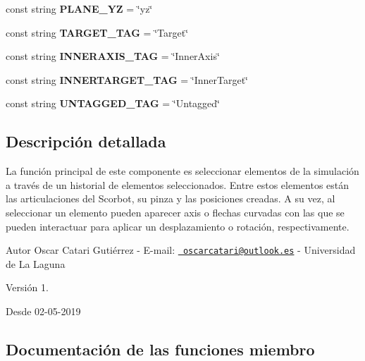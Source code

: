\begin{DoxyCompactItemize}
const string {\bfseries P\+L\+A\+N\+E\+\_\+\+YZ} = \char`\"{}yz\char`\"{}
\item 
\mbox{\label{class_selection_control_a5371a09abf89f536bbc2ceeababda6ee}} 
const string {\bfseries T\+A\+R\+G\+E\+T\+\_\+\+T\+AG} = \char`\"{}Target\char`\"{}
\item 
\mbox{\label{class_selection_control_aea51d2511ec20b79842fe82922ef9652}} 
const string {\bfseries I\+N\+N\+E\+R\+A\+X\+I\+S\+\_\+\+T\+AG} = \char`\"{}Inner\+Axis\char`\"{}
\item 
\mbox{\label{class_selection_control_abc54b661331a4e114367de3ac2821ca5}} 
const string {\bfseries I\+N\+N\+E\+R\+T\+A\+R\+G\+E\+T\+\_\+\+T\+AG} = \char`\"{}Inner\+Target\char`\"{}
\item 
\mbox{\label{class_selection_control_adc983bc4fe003204d01a105ef7864f28}} 
const string {\bfseries U\+N\+T\+A\+G\+G\+E\+D\+\_\+\+T\+AG} = \char`\"{}Untagged\char`\"{}
\end{DoxyCompactItemize}


\subsection{Descripción detallada}
La función principal de este componente es seleccionar elementos de la simulación a través de un historial de elementos seleccionados. Entre estos elementos están las articulaciones del Scorbot, su pinza y las posiciones creadas. A su vez, al seleccionar un elemento pueden aparecer axis o flechas curvadas con las que se pueden interactuar para aplicar un desplazamiento o rotación, respectivamente. \begin{DoxyAuthor}{Autor}
Oscar Catari Gutiérrez -\/ E-\/mail\+: \href{mailto:oscarcatari@outlook.es}{\texttt{ oscarcatari@outlook.\+es}} -\/ Universidad de La Laguna 
\end{DoxyAuthor}
\begin{DoxyVersion}{Versión}
1. 
\end{DoxyVersion}
\begin{DoxySince}{Desde}
02-\/05-\/2019 
\end{DoxySince}


\subsection{Documentación de las funciones miembro}
\mbox{\label{class_selection_control_ae0e2d8a1673fab1de51bee6e15d3f872}} 
